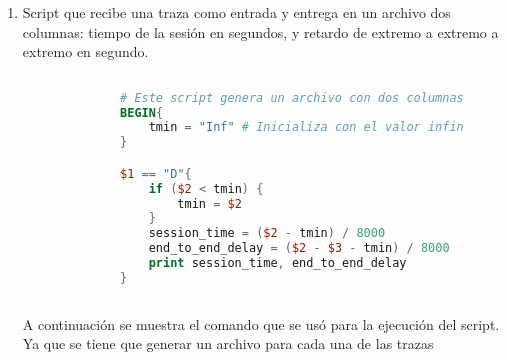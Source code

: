 \begin{enumerate}
\begin{figure}[H]
\begin{lstlisting}[frame=single, breaklines=true, basicstyle=\footnotesize\ttfamily, breakatwhitespace=false, 
        columns=flexible, tabsize=2, showstringspaces=false, language=AWK]
        $1 == "D"{  # Solo se calcula la diferencia cuando hay un paquete recibido
            diff = $2 - $3 # Ya que solo es la diferencia no se toma encuenta que el numero que se obtiene puede ser negativo
            if (diff < min_diff){
                min_diff = diff
            }
        }

        END{
            print "Archivo de entrada:", input_file
            print "Diferencia minima:", min_diff   
            print ""
        }

    \end{lstlisting}
    \label{fig:scriptDiferencia}
  \end{figure}

  \noindent Para la ejecuci\'on de este script usaremos como base la forma vista en el punto anterior. 
  Cambiando el nombre del script de \textit{script2.awk} a \textit{script3.awk}

  \item Script que recibe una traza como entrada y entrega en un archivo dos columnas: tiempo de la sesi\'on en segundos, 
  y retardo de extremo a extremo a extremo en segundo.
  \begin{figure}[H]
    \centering
    \begin{lstlisting}[frame=single, breaklines=true, basicstyle=\footnotesize\ttfamily, breakatwhitespace=false, 
        columns=flexible, tabsize=2, showstringspaces=false, language=AWK] 
  
        # Este script genera un archivo con dos columnas: tiempo de la sesion y retardo extremo a extremo.
        BEGIN{
            tmin = "Inf" # Inicializa con el valor infinito
        }

        $1 == "D"{
            if ($2 < tmin) {
                tmin = $2
            }
            session_time = ($2 - tmin) / 8000
            end_to_end_delay = ($2 - $3 - tmin) / 8000
            print session_time, end_to_end_delay
        }
              
    \end{lstlisting}
    \label{fig:scriptTiempoSesionRetardoExtremoExtremo}
  \end{figure}

  \noindent A continuaci\'on se muestra el comando que se us\'o para la ejecuci\'on del script. Ya que se tiene que generar
  un archivo para cada una de las trazas 
  \begin{figure}[H]
    \centering
    \begin{lstlisting}[frame=single, breaklines=true, basicstyle=\footnotesize\ttfamily, breakatwhitespace=false, 
      columns=flexible, tabsize=2, showstringspaces=false, language=bash]


\end{lstlisting}
\end{figure}
\end{enumerate}
